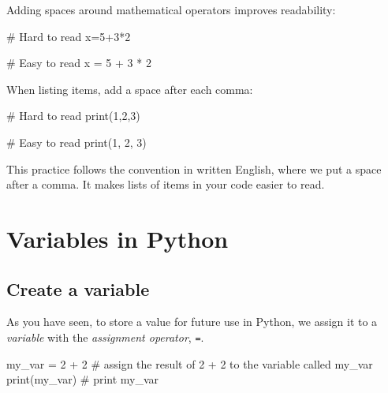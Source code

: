 \documentclass[
  letterpaper,
  DIV=11,
  numbers=noendperiod]{scrreprt}
\newenvironment{Shaded}{\begin{snugshade}}{\end{snugshade}}
\newcommand{\BuiltInTok}[1]{\textcolor[rgb]{0.00,0.23,0.31}{#1}}
\newcommand{\CommentTok}[1]{\textcolor[rgb]{0.37,0.37,0.37}{#1}}
\newcommand{\DecValTok}[1]{\textcolor[rgb]{0.68,0.00,0.00}{#1}}
\newcommand{\NormalTok}[1]{\textcolor[rgb]{0.00,0.23,0.31}{#1}}
\newcommand{\OperatorTok}[1]{\textcolor[rgb]{0.37,0.37,0.37}{#1}}
\begin{document}
Adding spaces around mathematical operators improves readability:

\begin{Shaded}
\begin{Highlighting}[]
\CommentTok{\# Hard to read}
\NormalTok{x}\OperatorTok{=}\DecValTok{5}\OperatorTok{+}\DecValTok{3}\OperatorTok{*}\DecValTok{2}

\CommentTok{\# Easy to read}
\NormalTok{x }\OperatorTok{=} \DecValTok{5} \OperatorTok{+} \DecValTok{3} \OperatorTok{*} \DecValTok{2}
\end{Highlighting}
\end{Shaded}

When listing items, add a space after each comma:

\begin{Shaded}
\begin{Highlighting}[]
\CommentTok{\# Hard to read}
\BuiltInTok{print}\NormalTok{(}\DecValTok{1}\NormalTok{,}\DecValTok{2}\NormalTok{,}\DecValTok{3}\NormalTok{)}

\CommentTok{\# Easy to read}
\BuiltInTok{print}\NormalTok{(}\DecValTok{1}\NormalTok{, }\DecValTok{2}\NormalTok{, }\DecValTok{3}\NormalTok{)}
\end{Highlighting}
\end{Shaded}

This practice follows the convention in written English, where we put a
space after a comma. It makes lists of items in your code easier to
read.

\section{Variables in Python}\label{variables-in-python}

\subsection{Create a variable}\label{create-a-variable}

As you have seen, to store a value for future use in Python, we assign
it to a \emph{variable} with the \emph{assignment operator}, \texttt{=}.

\begin{Shaded}
\begin{Highlighting}[]
\NormalTok{my\_var }\OperatorTok{=} \DecValTok{2} \OperatorTok{+} \DecValTok{2}  \CommentTok{\# assign the result of \textasciigrave{}2 + 2 \textasciigrave{} to the variable called \textasciigrave{}my\_var\textasciigrave{}}
\BuiltInTok{print}\NormalTok{(my\_var)  }\CommentTok{\# print my\_var}
\end{Highlighting}
\end{Shaded}
\end{document}

